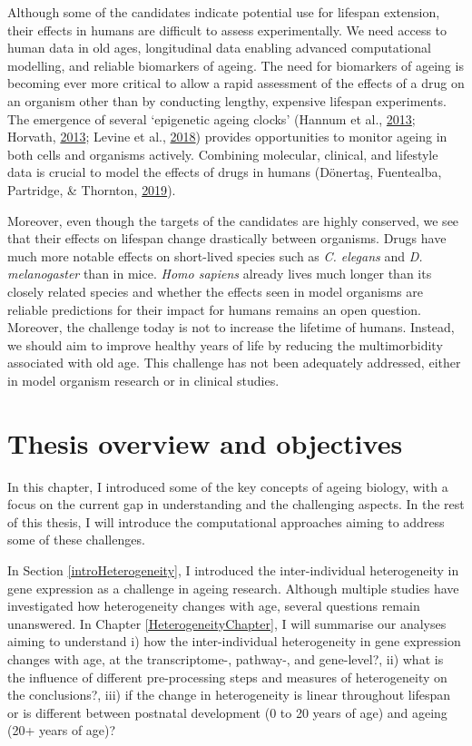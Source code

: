 \documentclass[12pt,twoside]{unicam}
\begin{document}
Although some of the candidates indicate potential use for lifespan extension, their effects in humans are difficult to assess experimentally. We need access to human data in old ages, longitudinal data enabling advanced computational modelling, and reliable biomarkers of ageing. The need for biomarkers of ageing is becoming ever more critical to allow a rapid assessment of the effects of a drug on an organism other than by conducting lengthy, expensive lifespan experiments. The emergence of several `epigenetic ageing clocks' (Hannum et al., \protect\hyperlink{ref-Hannum2013}{2013}; Horvath, \protect\hyperlink{ref-Horvath2013}{2013}; Levine et al., \protect\hyperlink{ref-Levine2018}{2018}) provides opportunities to monitor ageing in both cells and organisms actively. Combining molecular, clinical, and lifestyle data is crucial to model the effects of drugs in humans (Dönertaş, Fuentealba, Partridge, \& Thornton, \protect\hyperlink{ref-Donertas2019}{2019}).

Moreover, even though the targets of the candidates are highly conserved, we see that their effects on lifespan change drastically between organisms. Drugs have much more notable effects on short-lived species such as \emph{C. elegans} and \emph{D. melanogaster} than in mice. \emph{Homo sapiens} already lives much longer than its closely related species and whether the effects seen in model organisms are reliable predictions for their impact for humans remains an open question. Moreover, the challenge today is not to increase the lifetime of humans. Instead, we should aim to improve healthy years of life by reducing the multimorbidity associated with old age. This challenge has not been adequately addressed, either in model organism research or in clinical studies.

\hypertarget{thesis-overview-and-objectives}{%
\section{Thesis overview and objectives}\label{thesis-overview-and-objectives}}

In this chapter, I introduced some of the key concepts of ageing biology, with a focus on the current gap in understanding and the challenging aspects. In the rest of this thesis, I will introduce the computational approaches aiming to address some of these challenges.

In Section \ref{introHeterogeneity}, I introduced the inter-individual heterogeneity in gene expression as a challenge in ageing research. Although multiple studies have investigated how heterogeneity changes with age, several questions remain unanswered. In Chapter \ref{HeterogeneityChapter}, I will summarise our analyses aiming to understand i) how the inter-individual heterogeneity in gene expression changes with age, at the transcriptome-, pathway-, and gene-level?, ii) what is the influence of different pre-processing steps and measures of heterogeneity on the conclusions?, iii) if the change in heterogeneity is linear throughout lifespan or is different between postnatal development (0 to 20 years of age) and ageing (20+ years of age)?
\end{document}
